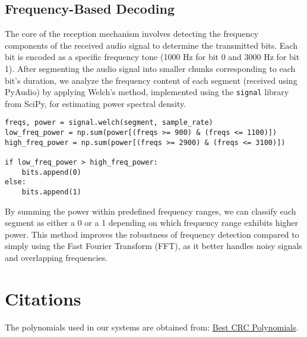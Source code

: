 \documentclass[11pt]{article}
\begin{document}
\subsection{Frequency-Based Decoding}

The core of the reception mechanism involves detecting the frequency components of the received audio signal to determine the transmitted bits. Each bit is encoded as a specific frequency tone (1000 Hz for bit 0 and 3000 Hz for bit 1). After segmenting the audio signal into smaller chunks corresponding to each bit's duration, we analyze the frequency content of each segment (received using PyAudio) by applying Welch's method, implemented using the \texttt{signal} library from SciPy, for estimating power spectral density.
\begin{tcolorbox}[colback=black!10!white, colframe=black]
    
\begin{verbatim} 
freqs, power = signal.welch(segment, sample_rate) 
low_freq_power = np.sum(power[(freqs >= 900) & (freqs <= 1100)])
high_freq_power = np.sum(power[(freqs >= 2900) & (freqs <= 3100)])

if low_freq_power > high_freq_power: 
    bits.append(0) 
else: 
    bits.append(1) \end{verbatim}
\end{tcolorbox}

By summing the power within predefined frequency ranges, we can classify each segment as either a 0 or a 1 depending on which frequency range exhibits higher power. This method improves the robustness of frequency detection compared to simply using the Fast Fourier Transform (FFT), as it better handles noisy signals and overlapping frequencies.


\section{Citations}
The polynomials used in our systems are obtained from: \href{https://users.ece.cmu.edu/~koopman/crc/hd5.html}{Best CRC Polynomials}.
\end{document}
